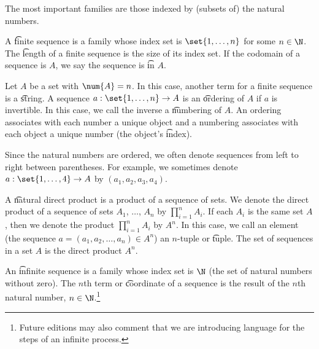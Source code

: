 

The most important families are those indexed by (subsets of) the natural numbers.


A \t{finite sequence} is a family whose index set is $\set{1, \dots, n}$ for some $n \in \N$.
The \t{length} of a finite sequence is the size of its index set.
If the codomain of a sequence is $A$, we say the sequence is \t{in} $A$.

Let $A$ be a set with $\num{A} = n$.
In this case, another term for a finite sequence is a \t{string}.
A sequence $a: \set{1, \dots, n} \to A$ is an \t{ordering} of $A$ if $a$ is invertible.
In this case, we call the inverse a \t{numbering} of $A$.
An ordering associates with each number a unique object and a numbering associates with each object a unique number (the object's \t{index}).


Since the natural numbers are ordered, we often denote sequences from left to right between parentheses.
For example, we sometimes denote $a: \set{1, \dots, 4} \to A$ by $(a_1, a_2, a_3, a_4)$.


A \t{natural direct product} is a product of a sequence of sets.
We denote the direct product of a sequence of sets $A_1$, $\dots$, $A_n$ by $\prod_{i = 1}^{n} A_i$.
If each $A_i$ is the same set $A$, then we denote the product $\prod_{i = 1}^{n} A_i$ by $A^n$.
In this case, we call an element (the sequence $a = (a_1, a_2, \dots, a_n) \in A^n$) an \t{$n$-tuple} or \t{tuple}.
The set of sequences in a set $A$ is the direct product $A^n$.


An \t{infinite sequence} is a family whose index set is $\N$ (the set of natural numbers without zero).
The \t{$n$th term} or \t{coordinate} of a sequence is the result of the $n$th natural number, $n \in \N$.\footnote{Future editions may also comment that we are introducing language for the steps of an infinite process.}

